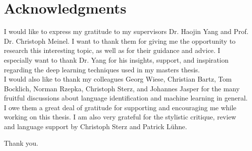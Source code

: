 \section*{\LARGE Acknowledgments}
I would like to express my gratitude to my supervisors Dr. Haojin Yang and Prof. Dr. Christoph Meinel. I want to thank them for giving me the opportunity to research this interesting topic, as well as for their guidance and advice. I especially want to thank Dr. Yang for his insights, support, and inspiration regarding the deep learning techniques used in my masters thesis.\\
I would also like to thank my colleagues Georg Wiese, Christian Bartz, Tom Bocklich, Norman Rzepka, Christoph Sterz, and Johannes Jasper for the many fruitful discussions about language identification and machine learning in general. I owe them a great deal of gratitude for supporting and encouraging me while working on this thesis. I am also very grateful for the stylistic critique, review and language support by Christoph Sterz and Patrick L\"uhne.

Thank you.

